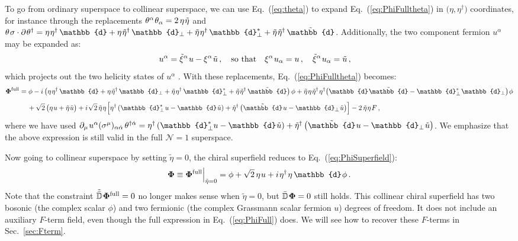 \documentclass[12pt,document,nofootinbib,superscriptaddress,onecolumn,preprintnumbers,balancelastpage]{article}
\newcommand{\full}{\text{full}}
\newcommand{\s}{\hspace{0.8pt}}
\newcommand{\PP}{\mathbb{d}}
\DeclareRobustCommand{\Sec}[1]{Sec.~\ref{#1}}
\DeclareRobustCommand{\Eq}[1]{Eq.~(\ref{#1})}
\newcommand{\bPhi}{ \boldsymbol \Phi}
\newcommand{\D}{\mathbb{D}}
\newcommand{\uu}{\tilde u}
\begin{document}
\begin{spacing}{1.2}
To go from ordinary superspace to collinear superspace, we can use \Eq{eq:theta} to expand \Eq{eq:PhiFulltheta} in $\big(\eta, \eta^\dagger\big)$ coordinates, for instance through the replacements $\theta^\alpha\s \theta_\alpha = 2\,  \eta\s \tilde{\eta}$ and $ \theta\s \sigma \cdot \partial\s \theta^\dagger= \eta\s \eta^\dagger\, \PP + \eta\s \tilde{\eta}^\dagger\, \PP_\perp + \tilde{\eta}\s \eta^\dagger\, \PP_\perp^* + \tilde{\eta}\s\tilde{\eta}^\dagger\, \tilde{\PP}$.
%
Additionally, the two component fermion $u^\alpha$ may be expanded as:  
%
\begin{align}
\label{eq:fermionExpan}
&u^\alpha =  \tilde{\xi}^\alpha\s u - \xi^\alpha\s \tilde{u} \,,  \quad \text{so that} \quad \xi^\alpha\s u_\alpha = u\, , \quad \tilde{\xi}^\alpha \s u_\alpha = \tilde{u}\,,
\end{align}
%
which projects out the two helicity states of $u^\alpha$ \cite{Cohen:2018qvn,Cohen:2016dcl}.
%
With these replacements, \Eq{eq:PhiFulltheta} becomes:
\newpage
%
 \begin{align}
 \label{eq:PhiFull}
  \bPhi^{\full} & =      \phi - i \left( \eta\s \eta^\dagger \,\PP + \eta\s \tilde{\eta}^\dagger\, \PP_\perp + \tilde{\eta}\s \eta^\dagger \,\PP_\perp^* + \tilde{\eta}\s\tilde{\eta}^\dagger\, \tilde{\PP} \right)\phi + \tilde{\eta}\s\eta\s \tilde{\eta}^\dagger\s \eta^\dagger \big(\PP\s \tilde{\PP} - \PP_\perp^*\s \PP_\perp \big)\s \phi \nonumber\\[5pt] 
 & \hspace{12pt}+ \sqrt{2}\, \big(\eta\s u +  \tilde{\eta}\s\uu\big)  + i\s \sqrt{2}\, \tilde{\eta}\s \eta\s \Bigl[ \eta^\dagger \left(\PP_\perp^*\s u - \PP\s \tilde{u} \right) + \tilde{\eta}^\dagger \left(\tilde{\PP}\s u - \PP_\perp\s \tilde{u} \right)  \Bigr] - 2\, \tilde{\eta}\s\eta\s F  \,,
 \end{align}
 where we have used $\partial_\mu\s u^\alpha (\sigma^\mu)_{\alpha \dot{\alpha}}\, \theta^{\dagger \dot{\alpha}}  
=  \eta^\dagger \left(\PP_\perp^* u - \PP\s \tilde{u} \right) + \tilde{\eta}^\dagger \left(\tilde{\PP}\s u - \PP_\perp\s \tilde{u} \right) $.
%
We emphasize that the above expression is still valid in the full $\mathcal{N} = 1$ superspace.


Now going to collinear superspace by setting $\tilde{\eta} = 0$, the chiral superfield reduces to \Eq{eq:PhiSuperfield}:
%
\begin{equation}
\label{eq:bPhi_definition}
\bPhi \equiv \bPhi^\full \Big|_{\tilde{\eta} = 0} = \phi + \sqrt{2}\,  \eta\s u + i\s \eta^\dagger\s \eta \, \PP\s \phi \,.
\end{equation}
%
Note that the constraint $\tilde{\bar{ \D}}\s  \bPhi^{\full} = 0$ no longer makes sense when $\tilde{\eta} = 0$, but $\bar{ \D}\s  \bPhi = 0$ still holds.
%
This collinear chiral superfield has two bosonic (the complex scalar $\phi$) and two fermionic (the complex Grassmann scalar fermion $u$) degrees of freedom.
%
It does not include an auxiliary $F$-term field, even though the full expression in \Eq{eq:PhiFull} does.
We will see how to recover these $F$-terms in \Sec{sec:Fterm}.



\end{spacing}
\end{document}
